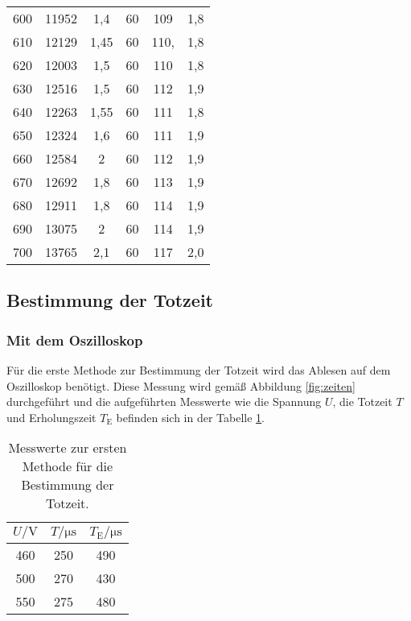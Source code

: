 \begin{table}[htpb]
\begin{tabular}{c c c c c c}
	     600&	11952&	1,4	&60	&109&1,8\\
	     610&	12129&	1,45&	60&	110,&1,8\\
	     620&	12003&	1,5	&60	&110&1,8\\
	     630&	12516&	1,5	&60	&112&1,9\\
	     640&	12263&	1,55&	60&	111&1,8\\
	     650&	12324&	1,6	&60&	111&1,9\\
	     660&	12584&	2	&60&	112&1,9\\
	     670&	12692&	1,8	&60&	113&1,9\\
	     680&	12911&	1,8	&60&	114&1,9\\
	     690&	13075&	2	&60&	114&1,9\\
	     700&	13765&	2,1	&60&	117&2,0\\	     
	\end{tabular}
\end{table}

\subsection{Bestimmung der Totzeit}
\subsubsection{Mit dem Oszilloskop}

Für die erste Methode zur Bestimmung der Totzeit wird das Ablesen auf dem Oszilloskop benötigt. Diese Messung wird gemäß Abbildung \ref{fig:zeiten} durchgeführt und die aufgeführten Messwerte wie die Spannung $U$, die Totzeit $T$ und Erholungszeit $T_\text{E}$ befinden sich in der Tabelle \ref{tab:erstemethode}.

\begin{table}[htpb]
	\centering
	\caption{Messwerte zur ersten Methode für die Bestimmung der Totzeit.}
	\label{tab:erstemethode}
	\begin{tabular}{c c c}
		\toprule
		$U / \si{\volt}$ & $T / \si{\micro\second}$ & $T_\text{E} / \si{\micro\second}$ \\
		\midrule
		460 & 250 & 490 \\
		500 & 270 & 430 \\
		550 & 275 & 480 \\
		\bottomrule
	\end{tabular}
\end{table}

